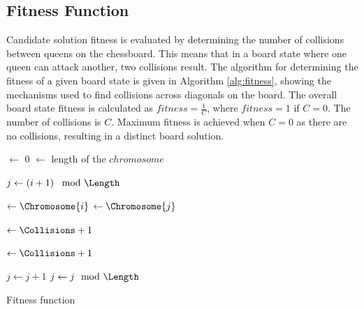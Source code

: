 \documentclass[conference]{IEEEtran}
\begin{document}
\subsection{Fitness Function}
Candidate solution fitness is evaluated by determining the number of collisions between queens on the chessboard. This means that in a board state where one queen can attack another, two collisions result. The algorithm for determining the fitness of a given board state is given in Algorithm \ref{alg:fitness}, showing the mechanisms used to find collisions across diagonals on the board. The overall board state fitness is calculated as $fitness = \frac{1}{C}$, where $fitness = 1$ if $C = 0$. The number of collisions is $C$. Maximum fitness is achieved when $C = 0$ as there are no collisions, resulting in a distinct board solution.
 
\begin{algorithm}[t!]
  \SetAlgoLined
  \DontPrintSemicolon
  
  {
    \BlankLine
    
    \Collisions $\leftarrow$ 0\;
    \Length $\leftarrow$ length of the $chromosome$\;
    \BlankLine
    
    {
      $j \leftarrow \left( i + 1 \right) \mod{\Length}$\;
      {
        \Yi $\leftarrow \Chromosome{i}$\;
        \Yj $\leftarrow \Chromosome{j}$\;
        \BlankLine
        
        \If{\Yi == \Yj}
        {
          \Collisions $\leftarrow \Collisions + 1$\; 
        }
        \BlankLine
        
        {
          \Collisions $\leftarrow \Collisions + 1$\;
        }
        \BlankLine
        
        $j \leftarrow j + 1$\;
        $j \leftarrow j \mod{\Length}$\;
      }
    }
    \BlankLine

    {
      \;
    }
    {
      \;
    }
  }
\caption{Fitness function}
\label{alg:fitness}
\end{algorithm}
\end{document}
